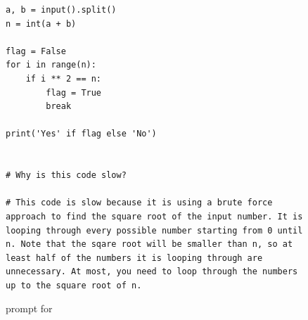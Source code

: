 \begin{figure}
\begin{verbatim}
a, b = input().split()
n = int(a + b)

flag = False
for i in range(n):
    if i ** 2 == n:
        flag = True
        break

print('Yes' if flag else 'No')


# Why is this code slow?

# This code is slow because it is using a brute force approach to find the square root of the input number. It is looping through every possible number starting from 0 until n. Note that the sqare root will be smaller than n, so at least half of the numbers it is looping through are unnecessary. At most, you need to loop through the numbers up to the square root of n.

\end{verbatim}
\caption{\fbmod prompt for \codeopt}
\label{fig:prompt:pie:fb}
\end{figure}